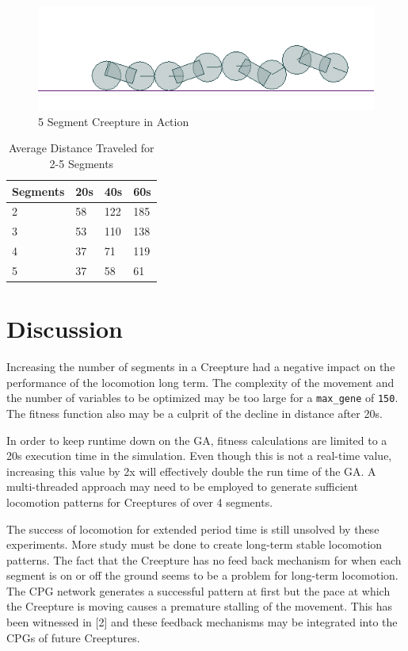 \documentclass{acm_proc_article-sp}
\begin{document}
\begin{figure}
\centering
\includegraphics[width=.5\textwidth]{images/chain.png}
\caption{5 Segment Creepture in Action \label{chain}}
\end{figure}

\begin{table}
\centering
\caption{Average Distance Traveled for 2-5 Segments}
\begin{tabular}{|l|l|l|l|} \hline
Segments & 20s & 40s & 60s\\ \hline
2 & 58 & 122 & 185\\ \hline
3 & 53 & 110 & 138\\ \hline
4 & 37 & 71 & 119\\ \hline
5 & 37 & 58 & 61\\ \hline
\end{tabular}
\end{table}

\section{Discussion}

Increasing the number of segments in a Creepture had a negative impact on
the performance of the locomotion long term. The complexity of the
movement and the number of variables to be optimized may be too large
for a \texttt{max\_gene} of \texttt{150}. The fitness function also may
be a culprit of the decline in distance after 20s.

In order to keep runtime down on the GA, fitness calculations are
limited to a 20s execution time in the simulation. Even though this is
not a real-time value, increasing this value by 2x will effectively
double the run time of the GA.  A multi-threaded approach may need to be employed to generate sufficient locomotion patterns for Creeptures of over 4 segments.

The success of locomotion for extended period time is still unsolved by these experiments.  More study must be done to create long-term stable locomotion patterns.  The fact that the Creepture has no feed back mechanism for when each segment is on or off the ground seems to be a problem for long-term locomotion.  The CPG network generates a successful pattern at first but the pace at which the Creepture is moving causes a premature stalling of the movement.  This has been witnessed in [2] and these feedback mechanisms may be integrated into the CPGs of future Creeptures.
\end{document}
